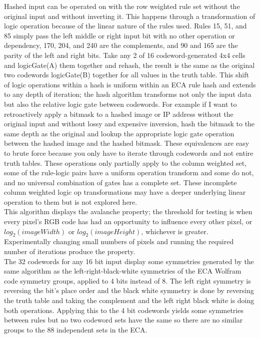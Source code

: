 \documentclass[11pt]{article}
\begin{document}
Hashed input can be operated on with the row weighted rule set without the original input and without inverting it. This happens through a transformation of logic operation because of the linear nature of the rules used. Rules 15, 51, and 85 simply pass the left middle or right input bit with no other operation or dependency, 170, 204, and 240 are the complements, and 90 and 165 are the parity of the left and right bits. Take any 2 of 16 codeword-generated 4x4 cells and logicGate(A) them together and rehash, the result is the same as the original two codewords logicGate(B) together for all values in the truth table. This shift of logic operations within a hash is uniform within an ECA rule hash and extends to any depth of iteration; the hash algorithm transforms not only the input data but also the relative logic gate between codewords. For example if I want to retroactively apply a bitmask to a hashed image or IP address without the original input and without lossy and expensive inversion, hash the bitmask to the same depth as the original and lookup the appropriate logic gate operation between the hashed image and the hashed bitmask. These equivalences are easy to brute force because you only have to iterate through codewords and not entire truth tables. These operations only partially apply to the column weighted set, some of the rule-logic pairs have a uniform operation transform and some do not, and no universal combination of gates has a complete set.  These incomplete column weighted logic op transformations may have a deeper underlying linear operation to them but is not explored here.\\

This algorithm displays the avalanche property; the threshold for testing is when every pixel's RGB code has had an opportunity to influence every other pixel, or $log_2(imageWidth)$ or $log_2(imageHeight)$, whichever is greater. Experimentally changing small numbers of pixels and running the required number of iterations produce the property. \\

The 32 codewords for any 16 bit input display some symmetries generated by the same algorithm as the left-right-black-white symmetries of the ECA Wolfram code symmetry groups, applied to 4 bits instead of 8. The left right symmetry is reversing the bit's place order and the black white symmetry is done by reversing the truth table and taking the complement and the left right black white is doing both operations. Applying this to the 4 bit codewords yields some symmetries between rules but no two codeword sets have the same so there are no similar groups to the 88 independent sets in the ECA.\cite{Wolfram}\\
\end{document}
